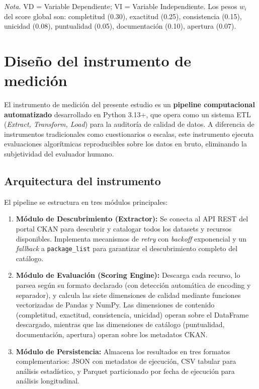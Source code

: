 \documentclass[12pt,letterpaper]{article}
\begin{document}
\textit{Nota.} VD = Variable Dependiente; VI = Variable Independiente. Los pesos $w_i$ del score global son: completitud (0.30), exactitud (0.25), consistencia (0.15), unicidad (0.08), puntualidad (0.05), documentación (0.10), apertura (0.07).

\section{Diseño del instrumento de medición}

El instrumento de medición del presente estudio es un \textbf{pipeline computacional automatizado} desarrollado en Python 3.13+, que opera como un sistema ETL (\textit{Extract, Transform, Load}) para la auditoría de calidad de datos. A diferencia de instrumentos tradicionales como cuestionarios o escalas, este instrumento ejecuta evaluaciones algorítmicas reproducibles sobre los datos en bruto, eliminando la subjetividad del evaluador humano.

\subsection{Arquitectura del instrumento}

El pipeline se estructura en tres módulos principales:

\begin{enumerate}
  \item \textbf{Módulo de Descubrimiento (Extractor):} Se conecta al API REST del portal CKAN para descubrir y catalogar todos los datasets y recursos disponibles. Implementa mecanismos de \textit{retry} con \textit{backoff} exponencial y un \textit{fallback} a \texttt{package\_list} para garantizar el descubrimiento completo del catálogo.

  \item \textbf{Módulo de Evaluación (Scoring Engine):} Descarga cada recurso, lo parsea según su formato declarado (con detección automática de encoding y separador), y calcula las siete dimensiones de calidad mediante funciones vectorizadas de Pandas y NumPy. Las dimensiones de contenido (completitud, exactitud, consistencia, unicidad) operan sobre el DataFrame descargado, mientras que las dimensiones de catálogo (puntualidad, documentación, apertura) operan sobre los metadatos CKAN.

  \item \textbf{Módulo de Persistencia:} Almacena los resultados en tres formatos complementarios: JSON con metadatos de ejecución, CSV tabular para análisis estadístico, y Parquet particionado por fecha de ejecución para análisis longitudinal.
\end{enumerate}
\end{document}

